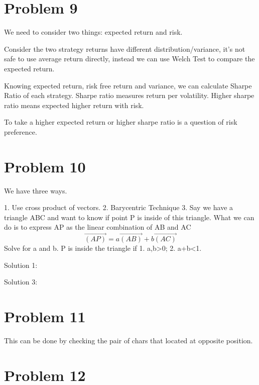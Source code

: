 \documentclass[12pt]{amsart}
\begin{document}
\section{Problem 9}

We need to consider two things: expected return and risk.

Consider the two strategy returns have different distribution/variance, it's not safe to use average return directly, instead we can use Welch Test to compare the expected return.

Knowing expected return, risk free return and variance, we can calculate Sharpe Ratio of each strategy. Sharpe ratio measures return per volatility. Higher sharpe ratio means expected higher return with risk.

 To take a higher expected return or higher sharpe ratio is a question of risk preference.

\section{Problem 10}

We have three ways.

1. Use cross product of vectors. 
2. Barycentric Technique
3. Say we have a triangle ABC and want to know if point P is inside of this triangle. What we can do is to express AP as the linear combination of AB and AC
\[
\vec{(AP)}=a\vec{(AB)}+b\vec{(AC)}
\]
Solve for a and b. P is inside the triangle if 1. a,b>0; 2. a+b<1.

Solution 1:
\begin{framed}

\end{framed}

Solution 3:

\begin{framed}

\end{framed}

\section{Problem 11}
This can be done by checking the pair of chars that located at opposite position. 

\begin{framed}

\end{framed}



\section{Problem 12}
\end{document}
